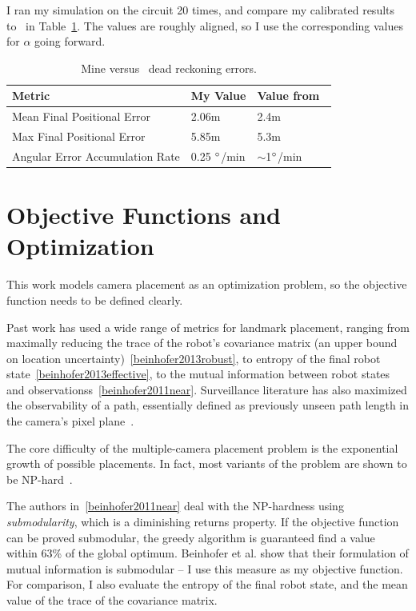 \documentclass[a4paper,12pt,twoside,openright]{report}
\begin{document}
I ran my simulation on the circuit 20 times, and compare my calibrated results to~\cite{vivacqua2017low} in
Table~\ref{tab:impl:calibration}. The values are roughly aligned, so I use
the corresponding values for $\alpha$ going forward.

\begin{table}[htb]
\centering
\caption[Noise Calibration Results]{Mine versus~\citeauthor{vivacqua2017low} dead reckoning errors.}
\label{tab:impl:calibration}
\begin{tabular}{@{}lll@{}}
\toprule
Metric                          & My Value           & Value from~\cite{vivacqua2017low} \\ \midrule
Mean Final Positional Error     & 2.06m              & 2.4m                                                          \\
Max Final Positional Error      & 5.85m              & 5.3m                                                          \\
Angular Error Accumulation Rate & 0.25 $\degree$/min & $\sim$1$\degree$/min                                         
\end{tabular}
\end{table}


\section{Objective Functions and Optimization}

This work models camera placement as an optimization problem, 
so the objective function needs to be defined clearly.

Past work has used a wide range of metrics for landmark placement, ranging from
maximally reducing the trace of the robot's covariance matrix (an upper bound on location
uncertainty)~\ref{beinhofer2013robust}, to entropy of the final
robot state~\ref{beinhofer2013effective}, to the mutual information between
robot states and observationss~\ref{beinhofer2011near}. Surveillance literature
has also maximized the observability of a path, essentially defined as
previously unseen path length in the camera's pixel plane~\cite{bodo2007optimal}.

The core difficulty of the multiple-camera placement problem is the exponential
growth of possible placements. In fact, most variants of the problem are shown to be NP-hard~\cite{beinhofer2014landmark}.

The authors in~\ref{beinhofer2011near} deal with the NP-hardness 
using \textit{submodularity}, which is a diminishing returns property.
If the objective function can be proved submodular, the greedy
algorithm is guaranteed find a value within 63\% of the global optimum.
Beinhofer et al. show that their formulation of mutual information is submodular --
I use this measure as my objective function. For comparison, I also
evaluate the entropy of the final robot state, and the mean
value of the trace of the covariance matrix.
\end{document}
